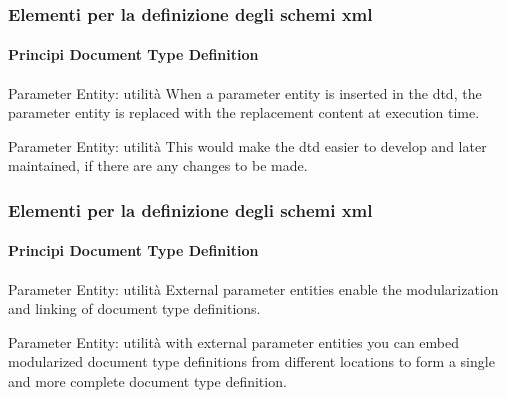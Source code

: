 \begin{frame}
    \frametitle{Elementi per la definizione degli schemi xml}
    \framesubtitle{Principi Document Type Definition}
    \addtocounter{nframe}{1}

    \begin{block}{Parameter Entity: utilità}
     When a parameter entity is inserted in the dtd, the parameter entity is replaced with the replacement content at execution time.
    \end{block}

    \begin{block}{Parameter Entity: utilità}
        This would make the dtd easier to develop and later maintained, if there are
        any changes to be made.
    \end{block}
\end{frame}

\begin{frame}
    \frametitle{Elementi per la definizione degli schemi xml}
    \framesubtitle{Principi Document Type Definition}
    \addtocounter{nframe}{1}

    \begin{block}{Parameter Entity: utilità}
        External parameter entities enable the modularization and linking of document
        type definitions.
    \end{block}

    \begin{block}{Parameter Entity: utilità}
        with external parameter entities you can embed modularized document type
        definitions from different locations to form a single and more complete
        document type definition.
    \end{block}
\end{frame}





